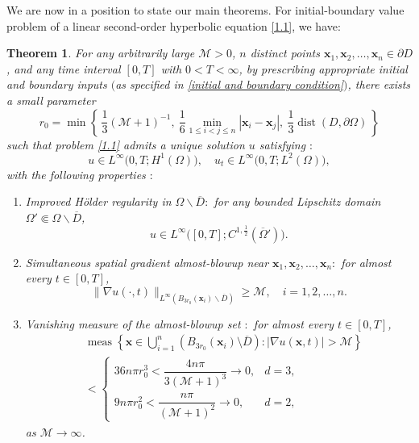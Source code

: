 \documentclass[11pt,reqno,oneside]{amsart}
\numberwithin{equation}{section}
\newtheorem{theorem}{Theorem}[section]
\theoremstyle{definition}
\theoremstyle{remark}
\numberwithin{equation}{section}
\begin{document}
	We are now in a position to state our main theorems. For initial-boundary value problem of a linear second-order hyperbolic equation \eqref{1.1}, we have:
	\begin{theorem}\label{thm:main}
		For any arbitrarily large $\mathcal{M} > 0$, $n$ distinct points $\mathbf{x}_1,\mathbf{x}_2,\ldots,\mathbf{x}_n \in \partial D$, and any time interval $[0,T]$ with $0 < T < \infty$, by prescribing appropriate initial and boundary inputs $($as specified in \eqref{initial and boundary condition}$)$, there exists a small parameter
		$$ r_0 = \min\left\{\,
		\frac{1}{3}(\mathcal{M} + 1)^{-1},\ 
		\frac{1}{6}\min_{1 \le i < j \le n} |\mathbf{x}_i - \mathbf{x}_j|,\ 
		\frac{1}{3}\operatorname{dist}(D, \partial \Omega)
		\,\right\}$$
		such that problem \eqref{1.1} admits a unique solution $u$ satisfying $:$
		$$
		u \in L^{\infty}\big(0,T;H^{1}(\Omega)\big), \quad 
		u_t \in L^{\infty}\big(0,T;L^{2}(\Omega)\big),
		$$
		with the following properties $:$
		\begin{enumerate}
			\item Improved H\"older regularity in $\Omega\backslash\overline{D}:$
			for any bounded Lipschitz domain $\Omega' \Subset \Omega\backslash\overline{D}$,
			\[
			u \in L^{\infty}\big([0,T]; C^{1,\frac{1}{2}}(\overline{\Omega}')\big).
			\]
			\item Simultaneous spatial gradient almost-blowup near $\mathbf{x}_1,\mathbf{x}_2,\dots,\mathbf{x}_n :$ for almost every $t \in [0,T]$,
			\[
			\|\nabla u(\cdot,t)\|_{L^{\infty} (B_{3r_0}(\mathbf{x}_i) \backslash \overline{D})} \geq \mathcal{M}, \quad i=1,2,\dots,n.
			\]
			\item Vanishing measure of the almost-blowup set $:$ 
			for almost every $t \in [0,T]$,
			\begin{equation*}
				\begin{aligned}
					&\operatorname{meas}\left\{ \mathbf{x} \in \bigcup_{i=1}^{n} \left(B_{3r_0}(\mathbf{x}_i)\setminus \overline{D}\right) : |\nabla u(\mathbf{x},t)| > \mathcal{M} \right\}\\
					&	< \begin{cases}
						36n\pi r_0^3 < \dfrac{4n\pi}{3(\mathcal{M} + 1)^3} \to 0,&d=3, \\
						9n\pi r_0^2 < \dfrac{n\pi}{(\mathcal{M}+1)^2} \to 0,&d=2,
					\end{cases}
				\end{aligned}
			\end{equation*}
			as $\mathcal{M} \to \infty$.
		\end{enumerate}
	\end{theorem}
	
\end{document}
